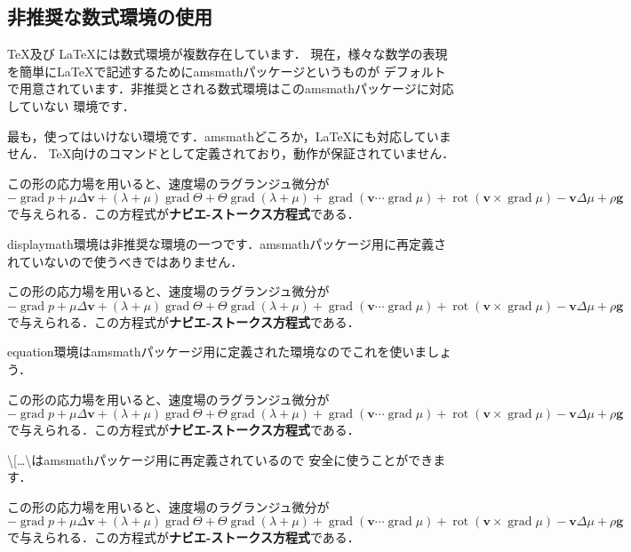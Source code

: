 \documentclass[dvipdfmx,uplatex]{jsarticle}
\DeclareMathOperator{\grad}{\mathrm{grad}}
\DeclareMathOperator{\rot}{\mathrm{rot}}
\begin{document}
{\subsection{非推奨な数式環境の使用}
\TeX 及び \LaTeX には数式環境が複数存在しています．
現在，様々な数学の表現を簡単に\LaTeX で記述するためにamsmathパッケージというものが
デフォルトで用意されています．非推奨とされる数式環境はこのamsmathパッケージに対応していない
環境です．
\begin{tcolorbox}[title=ディスプレイ数式モードの数式環境]
  最も，使ってはいけない環境です．amsmathどころか，\LaTeX にも対応していません．
  \TeX 向けのコマンドとして定義されており，動作が保証されていません．
  \begin{tcolorbox}[title=\$\$\ldots\$\$,colframe=wrongcolor]
    この形の応力場を用いると、速度場のラグランジュ微分が
    $$
    -\grad p + \mu\Delta \bm{v} + (\lambda + \mu)\grad\Theta +
    \Theta\grad(\lambda + \mu) + \grad(\bm{v} \cdots \grad\mu) +
    \rot(\bm{v} \times \grad\mu) - \bm{v}\Delta\mu + \rho\bm{g}
    $$
    で与えられる．この方程式が\textbf{ナビエ-ストークス方程式}である．
  \end{tcolorbox}
  displaymath環境は非推奨な環境の一つです．amsmathパッケージ用に再定義されていないので使うべきではありません．
  \begin{tcolorbox}[title=displaymath環境,colframe=wrongcolor]
    この形の応力場を用いると、速度場のラグランジュ微分が
    \begin{displaymath}
      -\grad p + \mu\Delta \bm{v} + (\lambda + \mu)\grad\Theta +
      \Theta\grad(\lambda + \mu) + \grad(\bm{v} \cdots \grad\mu) +
      \rot(\bm{v} \times \grad\mu) - \bm{v}\Delta\mu + \rho\bm{g}
    \end{displaymath}
    で与えられる．この方程式が\textbf{ナビエ-ストークス方程式}である．
  \end{tcolorbox}
  equation環境はamsmathパッケージ用に定義された環境なのでこれを使いましょう．
  \begin{tcolorbox}[title=equation環境,colframe=correctcolor]
    この形の応力場を用いると、速度場のラグランジュ微分が
    \begin{equation}
      -\grad p + \mu\Delta \bm{v} + (\lambda + \mu)\grad\Theta +
      \Theta\grad(\lambda + \mu) + \grad(\bm{v} \cdots \grad\mu) +
      \rot(\bm{v} \times \grad\mu) - \bm{v}\Delta\mu + \rho\bm{g}
    \end{equation}
    で与えられる．この方程式が\textbf{ナビエ-ストークス方程式}である．
  \end{tcolorbox}
    \textbackslash[\ldots\textbackslash\rsqbracket はamsmathパッケージ用に再定義されているので
    安全に使うことができます．
    \begin{tcolorbox}[title=\textbackslash[\ldots\textbackslash\rsqbracket,colframe=correctcolor]
      この形の応力場を用いると、速度場のラグランジュ微分が
    \[
    -\grad p + \mu\Delta \bm{v} + (\lambda + \mu)\grad\Theta +
    \Theta\grad(\lambda + \mu) + \grad(\bm{v} \cdots \grad\mu) +
    \rot(\bm{v} \times \grad\mu) - \bm{v}\Delta\mu + \rho\bm{g}
    \]
    で与えられる．この方程式が\textbf{ナビエ-ストークス方程式}である．
  \end{tcolorbox}
\end{tcolorbox}

}
\end{document}
